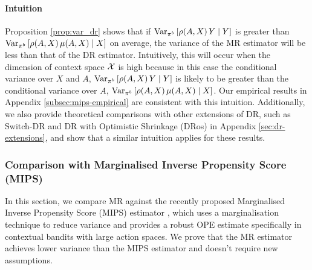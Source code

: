 \paragraph{Intuition}
Proposition \ref{prop:var_dr} shows that if $\textup{Var}_{\pi^b}\left[ \rho(A, X)\,Y \mid Y \right]$ is greater than $\textup{Var}_{\pi^b}\left[ \rho(A, X)\,\mu(A, X) \mid X \right]$ on average, the variance of the MR estimator will be less than that of the DR estimator. 
Intuitively, this will occur when the dimension of context space $\mathcal{X}$ is high because in this case the conditional variance over $X$ and $A$, $\textup{Var}_{\pi^b}\left[\rho(A, X)\,Y \mid Y \right]$ is likely to be greater than the conditional variance over $A$, $\textup{Var}_{\pi^b}\left[ \rho(A, X)\,\mu(A, X) \mid X \right]$. Our empirical results in Appendix \ref{subsec:mips-empirical} are consistent with this intuition.
Additionally, we also provide theoretical comparisons with other extensions of DR, such as Switch-DR \citep{wang2017optimal} and DR with Optimistic Shrinkage (DRos) \citep{su2020doubly} in Appendix \ref{sec:dr-extensions}, and show that a similar intuition applies for these results. 

\subsubsection{Comparison with Marginalised Inverse Propensity Score (MIPS) \citep{saito2022off}}\label{subsec:mips-comparison}
In this section, we compare MR against the recently proposed Marginalised Inverse Propensity Score (MIPS) estimator \citep{saito2022off}, which uses a marginalisation technique to reduce variance and provides a robust OPE estimate specifically in contextual bandits with large action spaces. We prove that the MR estimator achieves lower variance than the MIPS estimator and doesn't require new assumptions.



